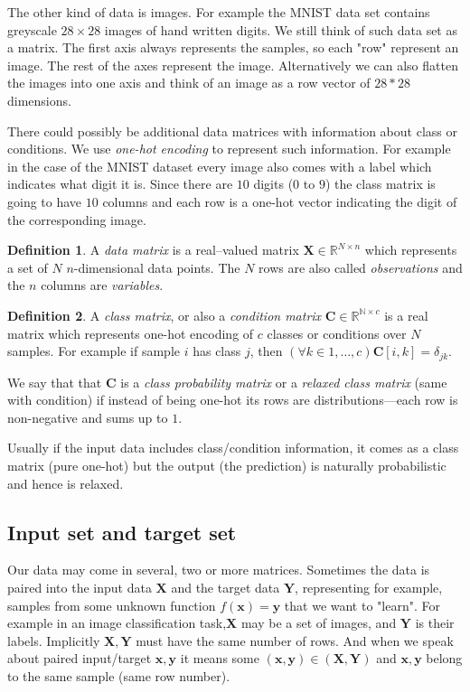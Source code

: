 \documentclass[11pt, a4paper]{report}
\theoremstyle{plain}
\theoremstyle{definition}
\newtheorem{mydef}{Definition}[chapter]
\theoremstyle{remark}
\newcommand{\N}{\mathbb{N}}
\newcommand{\R}{\mathbb{R}}
\newcommand{\X}{\mathbf{X}}
\newcommand{\x}{\mathbf{x}}
\newcommand{\Y}{\mathbf{Y}}
\newcommand{\y}{\mathbf{y}}
\newcommand{\bv}[1]{\boldsymbol{#1}}
\begin{document}
The other kind of data is images. For example the MNIST data set contains
greyscale $28 \times 28$ images of hand written digits. We still think of such
data set as a matrix. The first axis always represents the samples, so each
"row" represent an image. The rest of the axes represent the image.
Alternatively we can also flatten the images into one axis and think of an image
as a row vector of $28*28$ dimensions.

There could possibly be additional data matrices with information about class or
conditions. We use \emph{one-hot encoding} to represent such information. For
example in the case of the MNIST dataset every image also comes with a label
which indicates what digit it is. Since there are $10$ digits ($0$ to $9$) the
class matrix is going to have $10$ columns and each row is a one-hot vector
indicating the digit of the corresponding image.

\begin{mydef}
\label{def:datamatrix}
A \emph{data matrix} is a real--valued matrix $\bv{X} \in \R^{N \times n}$ which
represents a set of $N$ $n$-dimensional data points. The $N$ rows are also
called \emph{observations} and the $n$ columns are \emph{variables}.
\end{mydef}

\begin{mydef}
\label{def:classmatrix}
A \emph{class matrix}, or also a \emph{condition matrix} $\bv{C} \in \R^{\N
\times c}$ is a real matrix which represents one-hot encoding of $c$ classes or
conditions over $N$ samples. For example if sample $i$ has class $j$, then
$(\forall k\in 1, \dots, c) \bv{C}[i,k] = \delta_{jk}$.

We say that that $\bv{C}$ is a \emph{class probability matrix} or a
\emph{relaxed class matrix} (same with condition) if instead of being one-hot
its rows are distributions---each row is non-negative and sums up to $1$.
\end{mydef}

Usually if the input data includes class/condition information, it comes as a
class matrix (pure one-hot) but the output (the prediction) is naturally
probabilistic and hence is relaxed.

\subsection{Input set and target set}
Our data may come in several, two or more matrices. Sometimes the data is paired
into the input data $\X$ and the target data $\Y$, representing for example,
samples from some unknown function $f(\x) = \y$ that we want to "learn". For
example in an image classification task,$\X$ may be a set of images, and $\Y$ is
their labels. Implicitly $\X,\Y$ must have the same number of rows. And when we
speak about paired input/target $\x,\y$ it means some $(\x,\y) \in (\X,\Y)$ and
$\x,\y$ belong to the same sample (same row number).
\end{document}
